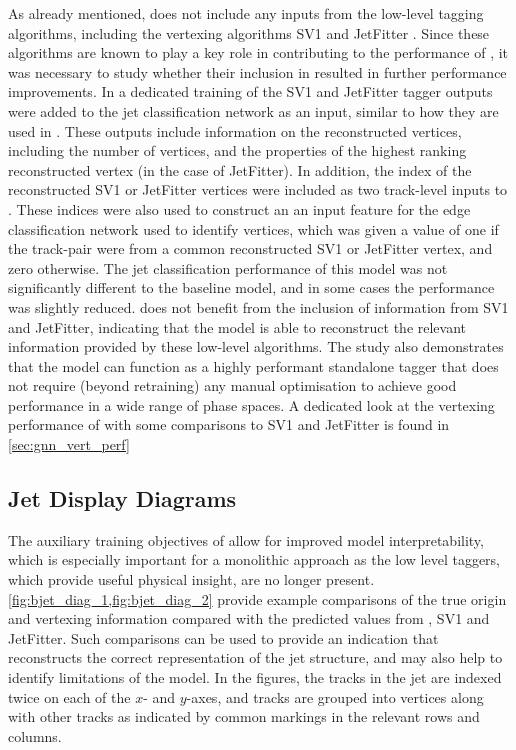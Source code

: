As already mentioned, \GNN does not include any inputs from the low-level tagging algorithms, including the vertexing algorithms SV1 and JetFitter \cite{FTAG-2018-01}.
Since these algorithms are known to play a key role in contributing to the performance of \DLr, it was necessary to study whether their inclusion in \GNN resulted in further performance improvements.
In a dedicated training of \GNN the SV1 and JetFitter tagger outputs were added to the \GNN jet classification network as an input, similar to how they are used in \DLr.
These outputs include information on the reconstructed vertices, including the number of vertices, and the properties of the highest ranking reconstructed vertex (in the case of JetFitter).
In addition, the index of the reconstructed SV1 or JetFitter vertices were included as two track-level inputs to \GNN.
These indices were also used to construct an an input feature for the edge classification network used to identify vertices, which was given a value of one if the track-pair were from a common reconstructed SV1 or JetFitter vertex, and zero otherwise.
The jet classification performance of this \GNN model was not significantly different to the baseline model, and in some cases the performance was slightly reduced.
\GNN does not benefit from the inclusion of information from SV1 and JetFitter, indicating that the model is able to reconstruct the relevant information provided by these low-level algorithms.
The study also demonstrates that the model can function as a highly performant standalone tagger that does not require (beyond retraining) any manual optimisation to achieve good performance in a wide range of phase spaces.
A dedicated look at the vertexing performance of \GNN with some comparisons to SV1 and JetFitter is found in \cref{sec:gnn_vert_perf}




\subsection{Jet Display Diagrams}

The auxiliary training objectives of \GNN allow for improved model interpretability, which is especially important for a monolithic approach as the low level taggers, which provide useful physical insight, are no longer present.
\cref{fig:bjet_diag_1,fig:bjet_diag_2} provide example comparisons of the true origin and vertexing information compared with the predicted values from \GNN, SV1 and JetFitter.
Such comparisons can be used to provide an indication that \GNN reconstructs the correct representation of the jet structure, and may also help to identify limitations of the model.
In the figures, the tracks in the jet are indexed twice on each of the $x$- and $y$-axes, and tracks are  grouped into vertices along with other tracks as indicated by common markings in the relevant rows and columns.

